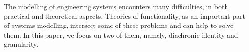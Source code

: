 \documentclass[
]{ceurart}
\begin{document}
The modelling of engineering systems encounters many difficulties, in both practical and theoretical aspects. 
Theories of functionality, as an important part of systems modelling, intersect some of these problems and can help to solve them. In this paper, we focus on two of them, namely, diachronic identity and granularity.
\end{document}
